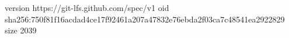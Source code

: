 version https://git-lfs.github.com/spec/v1
oid sha256:750f81f16acdad4ce17f92461a207a47832e76ebda2f03ca7c48541ea2922829
size 2039
